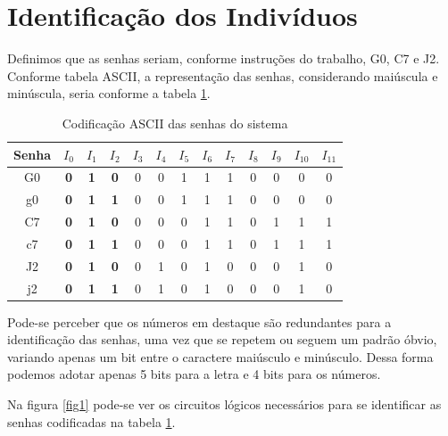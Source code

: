 \documentclass[12pt,a4paper]{article}
\begin{document}
\section{Identificação dos Indivíduos}

Definimos que as senhas seriam, conforme instruções do trabalho, G0, C7 e J2. Conforme tabela ASCII, a representação das senhas, considerando maiúscula e minúscula, seria conforme a tabela \ref{tab1}.

\bigskip

\begin{table}[hb]
\begin{center}
\begin{tabular}{c||cccccccc|cccc}
Senha & $I_0$ & $I_1$ & $I_2$ & $I_3$ & $I_4$ & $I_5$ & $I_6$ & $I_7$ & $I_8$ & $I_9$ & $I_{10}$ & $I_{11}$ \\
\hline
\hline
G0 & {\bf 0} & {\bf 1} & {\bf 0} & 0 & 0 & 1 & 1 & 1 & 0 & 0 & 0 & 0 \\
g0 & {\bf 0} & {\bf 1} & {\bf 1} & 0 & 0 & 1 & 1 & 1 & 0 & 0 & 0 & 0 \\
\hline
C7 & {\bf 0} & {\bf 1} & {\bf 0} & 0 & 0 & 0 & 1 & 1 & 0 & 1 & 1 & 1 \\
c7 & {\bf 0} & {\bf 1} & {\bf 1} & 0 & 0 & 0 & 1 & 1 & 0 & 1 & 1 & 1 \\
\hline
J2 & {\bf 0} & {\bf 1} & {\bf 0} & 0 & 1 & 0 & 1 & 0 & 0 & 0 & 1 & 0 \\
j2 & {\bf 0} & {\bf 1} & {\bf 1} & 0 & 1 & 0 & 1 & 0 & 0 & 0 & 1 & 0 \\
\end{tabular}
\end{center}
\caption{Codificação ASCII das senhas do sistema}
\label{tab1}
\end{table}

Pode-se perceber que os números em destaque são redundantes para a identificação das senhas, uma vez que se repetem ou seguem um padrão óbvio, variando apenas um bit entre o caractere maiúsculo e minúsculo. Dessa forma podemos adotar apenas 5 bits para a letra e 4 bits para os números.

Na figura \ref{fig1} pode-se ver os circuitos lógicos necessários para se identificar as senhas codificadas na tabela \ref{tab1}.
\end{document}
